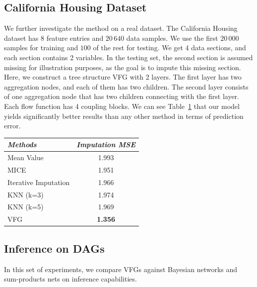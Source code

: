 \documentclass{article}
\begin{document}
\subsection{California Housing Dataset}
We further investigate the method on a real dataset.  
The California Housing dataset  has 8 feature entries and $20\,640$ data samples. 
We use the first $20\,000$ samples for training  and $100$ of the rest for testing.  
We get  4 data sections, and each section contains 2 variables. 
In the testing set, the second section is assumed missing for illustration purposes, as the goal is to impute this missing section.
Here, we construct a tree structure VFG with 2 layers. 
The first layer has two aggregation nodes, and each of them has two children. 
The second layer consists of one aggregation node that has two children connecting with the first layer.  
Each flow function has 4 coupling blocks. 
We can see Table~\ref{tab:imp_arrhytmia} that our model yields significantly better results than any other method in terms of prediction error. 
\begin{table}[ht]
\centering
 \begin{tabular}{l | c  }\hline
\textit{Methods} & \textit{Imputation MSE}  \\
\hline
Mean Value &1.993 \\
MICE & 1.951\\
Iterative Imputation & 1.966\\
KNN (k=3) &1.974 \\
KNN (k=5) &1.969 \\
\hline
VFG & \textbf{1.356} \\  
\hline
\end{tabular}
 \label{tab:imp_arrhytmia}
\end{table}


 
\subsection{Inference on DAGs}
In this set of experiments, we compare VFGs against Bayesian networks and sum-products nets on inference capabilities. 
\end{document}
